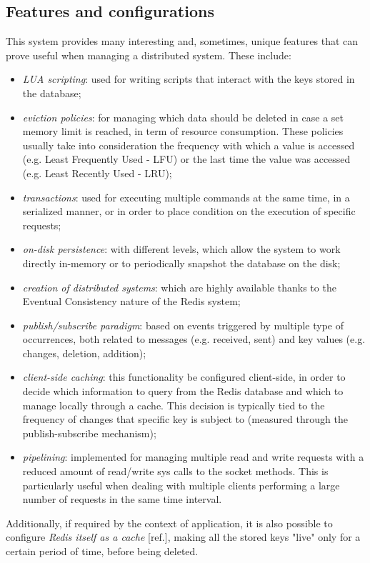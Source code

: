\subsection{Features and configurations}
This system provides many interesting and, sometimes, unique features that can prove useful when managing a distributed system. These include:
\begin{itemize}
	\item \textit{LUA scripting}: used for writing scripts that interact with the keys stored in the database;
	\item \textit{eviction policies}: for managing which data should be deleted in case a set memory limit is reached, in term of resource consumption. These policies usually take into consideration the frequency with which a value is accessed (e.g. Least Frequently Used - LFU) or the last time the value was accessed (e.g. Least Recently Used - LRU);
	\item \textit{transactions}: used for executing multiple commands at the same time, in a serialized manner, or in order to place condition on the execution of specific requests;
	\item \textit{on-disk persistence}: with different levels, which allow the system to work directly in-memory or to periodically snapshot the database on the disk;
	\item \textit{creation of distributed systems}: which are highly available thanks to the Eventual Consistency nature of the Redis system;
	\item \textit{publish/subscribe paradigm}: based on events triggered by multiple type of occurrences, both related to messages (e.g. received, sent) and key values (e.g. changes, deletion, addition);
	\item \textit{client-side caching}: this functionality be configured client-side, in order to decide which information to query from the Redis database and which to manage locally through a cache. This decision is typically tied to the frequency of changes that specific key is subject to (measured through the publish-subscribe mechanism);
	\item \textit{pipelining}: implemented for managing multiple read and write requests with a reduced amount of read/write sys calls to the socket methods. This is particularly useful when dealing with multiple clients performing a large number of requests in the same time interval.
\end{itemize}
Additionally, if required by the context of application, it is also possible to configure \textit{Redis itself as a cache} [ref.], making all the stored keys "live" only for a certain period of time, before being deleted.

